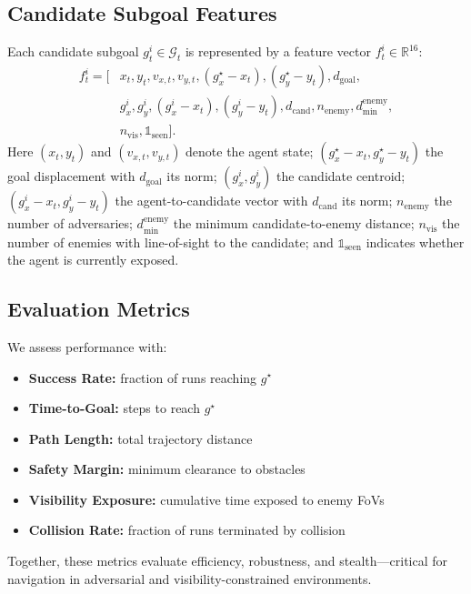 \documentclass[letterpaper, 10 pt, conference]{ieeeconf}
\begin{document}
\subsection{Candidate Subgoal Features}
Each candidate subgoal $g_t^i \in \mathcal{G}_t$ is represented by a feature vector $f_t^i \in \mathbb{R}^{16}$:
\begin{align*}
  f_t^i = \big[ & x_t, y_t, v_{x,t}, v_{y,t}, (g^\star_x - x_t), (g^\star_y - y_t), d_{\text{goal}}, \\
  & g^i_x, g^i_y, (g^i_x - x_t), (g^i_y - y_t), d_{\text{cand}}, n_{\text{enemy}}, d_{\min}^{\text{enemy}}, \\
  & n_{\text{vis}}, \mathbb{1}_{\text{seen}} \big].
\end{align*}
Here $(x_t, y_t)$ and $(v_{x,t}, v_{y,t})$ denote the agent state; $(g^\star_x - x_t, g^\star_y - y_t)$ the goal displacement with $d_{\text{goal}}$ its norm; $(g^i_x, g^i_y)$ the candidate centroid; $(g^i_x - x_t, g^i_y - y_t)$ the agent-to-candidate vector with $d_{\text{cand}}$ its norm; $n_{\text{enemy}}$ the number of adversaries; $d_{\min}^{\text{enemy}}$ the minimum candidate-to-enemy distance; $n_{\text{vis}}$ the number of enemies with line-of-sight to the candidate; and $\mathbb{1}_{\text{seen}}$ indicates whether the agent is currently exposed.

\subsection{Evaluation Metrics}
We assess performance with:
\begin{itemize}
    \item \textbf{Success Rate:} fraction of runs reaching $g^\star$  
    \item \textbf{Time-to-Goal:} steps to reach $g^\star$  
    \item \textbf{Path Length:} total trajectory distance  
    \item \textbf{Safety Margin:} minimum clearance to obstacles  
    \item \textbf{Visibility Exposure:} cumulative time exposed to enemy FoVs  
    \item \textbf{Collision Rate:} fraction of runs terminated by collision  
\end{itemize}
Together, these metrics evaluate efficiency, robustness, and stealth—critical for navigation in adversarial and visibility-constrained environments.


\end{document}

